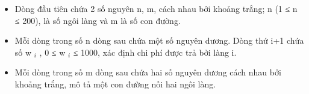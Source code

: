 \begin{itemize}
	\item     Dòng đầu tiên chứa 2 số nguyên n, m, cách nhau bởi khoảng trắng; n (1 ≤ n ≤ 200), là số ngôi làng và m là số con đường.   
	\item     Mỗi dòng trong số n dòng sau chứa một số nguyên dương. Dòng thứ i+1 chứa số w    $_     i    $    , 0  ≤  w    $_     i    $    ≤ 1000, xác định chi phí được trả bởi làng i.   
	\item     Mỗi dòng trong số m dòng sau chứa hai số nguyên dương cách nhau bởi khoảng trắng, mô tả một con đường nối hai ngôi làng.   
\end{itemize}

\